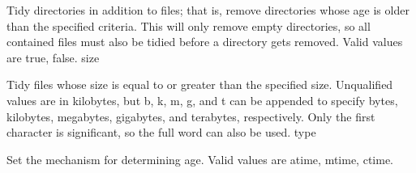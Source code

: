 Tidy directories in addition to files; that is, remove directories whose age is older than the specified criteria. This will only remove empty directories, so all contained files must also be tidied before a directory gets removed. Valid values are true, false.
size

Tidy files whose size is equal to or greater than the specified size. Unqualified values are in kilobytes, but b, k, m, g, and t can be appended to specify bytes, kilobytes, megabytes, gigabytes, and terabytes, respectively. Only the first character is significant, so the full word can also be used.
type

Set the mechanism for determining age. Valid values are atime, mtime, ctime.
